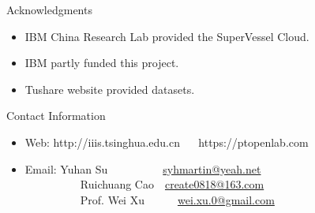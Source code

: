 \documentclass[final,hyperref={pdfpagelabels=false}]{beamer}
\begin{document}
\begin{frame}[t]
\begin{columns}[t]
\begin{column}{.445\textwidth}
\begin{block}{Acknowledgments}

\begin{itemize}
\item IBM China Research Lab provided the SuperVessel Cloud. 
\item IBM partly funded this project.
\item Tushare website provided datasets. 
\end{itemize}

\end{block}



\begin{block}{Contact Information}

\begin{itemize}
\item Web: http://iiis.tsinghua.edu.cn ~~ https://ptopenlab.com \\


\item Email: Yuhan Su~~~~~~~~~~\href{mailto:syhmartin@yeah.ne}{syhmartin@yeah.net} \\ 
~~~~~~~~~~Ruichuang Cao~~\href{mailto:create0818@163.com}{create0818@163.com} \\
~~~~~~~~~~Prof. Wei Xu~~~~~~\href{mailto:wei.xu.0@gmail.com}{wei.xu.0@gmail.com}
\end{itemize}

\end{block}


\end{column} %

\begin{column}{.015\textwidth}\end{column} %

\end{columns} %

\end{frame} %
\end{document}
